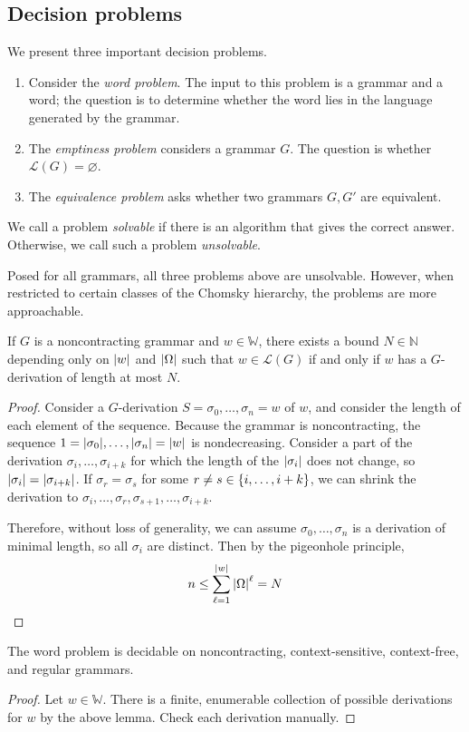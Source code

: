 \subsection{Decision problems}
We present three important decision problems.
\begin{enumerate}
	\item Consider the \emph{word problem}.
		The input to this problem is a grammar and a word; the question is to determine whether the word lies in the language generated by the grammar.
	\item The \emph{emptiness problem} considers a grammar \( G \).
		The question is whether \( \mathcal L(G) = \varnothing \).
	\item The \emph{equivalence problem} asks whether two grammars \( G, G' \) are equivalent.
\end{enumerate}
\begin{definition}
	We call a problem \emph{solvable} if there is an algorithm that gives the correct answer.
	Otherwise, we call such a problem \emph{unsolvable}.
\end{definition}
Posed for all grammars, all three problems above are unsolvable.
However, when restricted to certain classes of the Chomsky hierarchy, the problems are more approachable.
\begin{lemma}
	If \( G \) is a noncontracting grammar and \( w \in \mathbb W \), there exists a bound \( N \in \mathbb N \) depending only on \( \abs{w} \) and \( \abs{\Omega} \) such that \( w \in \mathcal L(G) \) if and only if \( w \) has a \( G \)-derivation of length at most \( N \).
\end{lemma}
\begin{proof}
	Consider a \( G \)-derivation \( S = \sigma_0, \dots, \sigma_n = w \) of \( w \), and consider the length of each element of the sequence.
	Because the grammar is noncontracting, the sequence \( 1 = \abs{\sigma_0}, \dots, \abs{\sigma_n} = \abs{w} \) is nondecreasing.
	Consider a part of the derivation \( \sigma_i, \dots, \sigma_{i+k} \) for which the length of the \( \abs{\sigma_i} \) does not change, so \( \abs{\sigma_i} = \abs{\sigma_{i+k}} \).
	If \( \sigma_r = \sigma_s \) for some \( r \neq s \in \qty{i, \dots, i+k} \), we can shrink the derivation to \( \sigma_i, \dots, \sigma_r, \sigma_{s+1}, \dots, \sigma_{i+k} \).

	Therefore, without loss of generality, we can assume \( \sigma_0, \dots, \sigma_n \) is a derivation of minimal length, so all \( \sigma_i \) are distinct.
	Then by the pigeonhole principle,
	\[ n \leq \sum_{\ell=1}^{\abs{w}} \abs{\Omega}^\ell = N \]
\end{proof}
\begin{corollary}
	The word problem is decidable on noncontracting, context-sensitive, context-free, and regular grammars.
\end{corollary}
\begin{proof}
	Let \( w \in \mathbb W \).
	There is a finite, enumerable collection of possible derivations for \( w \) by the above lemma.
	Check each derivation manually.
\end{proof}

